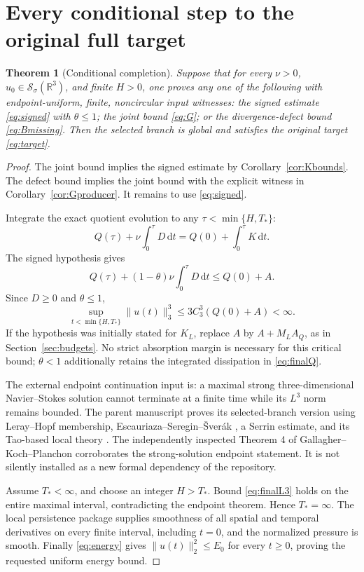 \documentclass[11pt,a4paper]{article}
\newtheorem{theorem}{Theorem}[section]
\theoremstyle{definition}
\theoremstyle{remark}
\newcommand{\R}{\mathbb R}
\newcommand{\dd}{\,\mathrm d}
\newcommand{\norm}[1]{\lVert #1\rVert}
\newcommand{\Sch}{\mathcal S_\sigma(\R^3)}
\numberwithin{equation}{section}
\begin{document}
\section{Every conditional step to the original full target}\label{sec:continuation}
\begin{theorem}[Conditional completion]\label{thm:completion}
Suppose that for every \(\nu>0\), \(u_0\in\Sch\), and finite \(H>0\), one proves any one of the following with endpoint-uniform, finite, noncircular input witnesses: the signed estimate \eqref{eq:signed} with \(\theta\le1\); the joint bound \eqref{eq:G}; or the divergence-defect bound \eqref{eq:Bmissing}. Then the selected branch is global and satisfies the original target \eqref{eq:target}.
\end{theorem}
\begin{proof}
The joint bound implies the signed estimate by Corollary~\ref{cor:Kbounds}. The defect bound implies the joint bound with the explicit witness in Corollary~\ref{cor:Gproducer}. It remains to use \eqref{eq:signed}.

Integrate the exact quotient evolution to any \(\tau<\min\{H,T_*\}\):
\[
Q(\tau)+\nu\int_0^\tau D\dd t=Q(0)+\int_0^\tau K\dd t.
\]
The signed hypothesis gives
\begin{equation}\label{eq:finalQ}
Q(\tau)+(1-\theta)\nu\int_0^\tau D\dd t\le Q(0)+A.
\end{equation}
Since \(D\ge0\) and \(\theta\le1\),
\begin{equation}\label{eq:finalL3}
\sup_{t<\min\{H,T_*\}}\norm{u(t)}_3^3
\le3C_3^3(Q(0)+A)<\infty.
\end{equation}
If the hypothesis was initially stated for \(K_L\), replace \(A\) by \(A+M_LA_Q\), as in Section~\ref{sec:budgets}. No strict absorption margin is necessary for this critical bound; \(\theta<1\) additionally retains the integrated dissipation in \eqref{eq:finalQ}.

The external endpoint continuation input is: a maximal strong three-dimensional Navier--Stokes solution cannot terminate at a finite time while its \(L^3\) norm remains bounded. The parent manuscript proves its selected-branch version using Leray--Hopf membership, Escauriaza--Seregin--\v Sver\'ak \cite{ESS}, a Serrin estimate, and its Tao-based local theory \cite{Tao,Paper}. The independently inspected Theorem 4 of Gallagher--Koch--Planchon \cite{GKP} corroborates the strong-solution endpoint statement. It is not silently installed as a new formal dependency of the repository.

Assume \(T_*<\infty\), and choose an integer \(H>T_*\). Bound \eqref{eq:finalL3} holds on the entire maximal interval, contradicting the endpoint theorem. Hence \(T_*=\infty\). The local persistence package supplies smoothness of all spatial and temporal derivatives on every finite interval, including \(t=0\), and the normalized pressure is smooth. Finally \eqref{eq:energy} gives \(\norm{u(t)}_2^2\le E_0\) for every \(t\ge0\), proving the requested uniform energy bound.
\end{proof}
\end{document}
